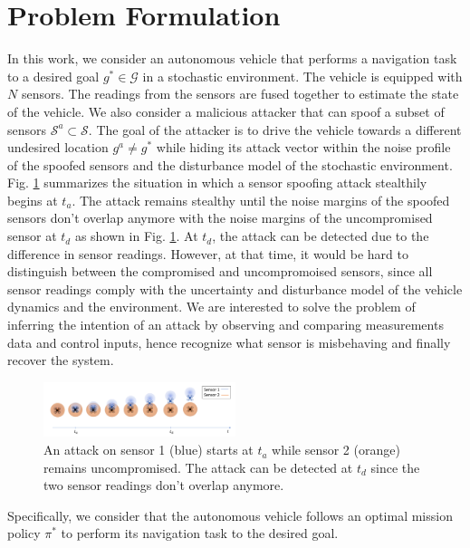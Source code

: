 \documentclass[letterpaper, 10 pt, conference]{ieeeconf}  %
\begin{document}
\section{Problem Formulation}\label{sec:problem}
In this work, we consider an autonomous vehicle that performs a navigation task to a desired goal $g^* \in \mathcal G$ in a stochastic environment. The vehicle is equipped with $N$ sensors. The readings from the sensors are fused together to estimate the state of the vehicle. We also consider a malicious attacker that can spoof a subset of sensors $\mathcal{S}^a \subset \mathcal{S}$. The goal of the attacker is to drive the vehicle towards a different undesired location $g^a \neq g^*$ while hiding its attack vector within the noise profile of the spoofed sensors and the disturbance model of the stochastic environment.  Fig. \ref{fig:sensor_spoofing} summarizes the situation in which a sensor spoofing attack stealthily begins at $t_a$. The attack remains stealthy until the noise margins of the spoofed sensors don't overlap anymore with the noise margins of the uncompromised sensor at $t_d$ as shown in Fig. \ref{fig:sensor_spoofing}. At $t_d$, the attack can be detected due to the difference in sensor readings. However, at that time, it would be hard to distinguish between the compromised and uncompromoised sensors, since all sensor readings comply with the uncertainty and disturbance model of the vehicle dynamics and the environment. We are interested to solve the problem of inferring the intention of an attack by observing and comparing measurements data and control inputs, hence recognize what sensor is misbehaving and finally recover the system.%
\begin{figure}[h]
\centering
\includegraphics[width=0.5\textwidth]{sensor_spoofing}
\caption{An attack on sensor 1 (blue) starts at $t_a$ while sensor 2 (orange) remains uncompromised. The attack can be detected at $t_d$ since the two sensor readings don't overlap anymore.}
 \label{fig:sensor_spoofing}
\end{figure}
Specifically, we consider that the autonomous vehicle follows an optimal mission policy $\pi^*$ to perform its navigation task to the desired goal. 
\end{document}
